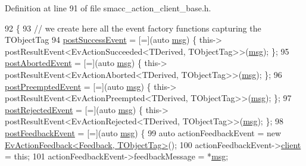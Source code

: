 Definition at line 91 of file smacc\+\_\+action\+\_\+client\+\_\+base.\+h.


\begin{DoxyCode}
92     \{
93         \textcolor{comment}{// we create here all the event factory functions capturing the TObjectTag}
94         \hyperlink{classsmacc_1_1client__bases_1_1SmaccActionClientBase_afb4f82508cd653d496392f321e84a783}{postSuccessEvent} = [=](\textcolor{keyword}{auto} \hyperlink{namespacebattery__monitor__node_ab1920c64448816edd4064e494275fdff}{msg}) \{ this->
      postResultEvent<EvActionSucceeded<TDerived, TObjectTag>>(\hyperlink{namespacebattery__monitor__node_ab1920c64448816edd4064e494275fdff}{msg}); \};
95         \hyperlink{classsmacc_1_1client__bases_1_1SmaccActionClientBase_a9ca2952ededeec233ee6d8a9a39c680b}{postAbortedEvent} = [=](\textcolor{keyword}{auto} \hyperlink{namespacebattery__monitor__node_ab1920c64448816edd4064e494275fdff}{msg}) \{ this->
      postResultEvent<EvActionAborted<TDerived, TObjectTag>>(\hyperlink{namespacebattery__monitor__node_ab1920c64448816edd4064e494275fdff}{msg}); \};
96         \hyperlink{classsmacc_1_1client__bases_1_1SmaccActionClientBase_a9513e302d447b04aafbca574d37a9ecc}{postPreemptedEvent} = [=](\textcolor{keyword}{auto} \hyperlink{namespacebattery__monitor__node_ab1920c64448816edd4064e494275fdff}{msg}) \{ this->
      postResultEvent<EvActionPreempted<TDerived, TObjectTag>>(\hyperlink{namespacebattery__monitor__node_ab1920c64448816edd4064e494275fdff}{msg}); \};
97         \hyperlink{classsmacc_1_1client__bases_1_1SmaccActionClientBase_a04cb60c48127e5534c1ce7045fb5abdc}{postRejectedEvent} = [=](\textcolor{keyword}{auto} \hyperlink{namespacebattery__monitor__node_ab1920c64448816edd4064e494275fdff}{msg}) \{ this->
      postResultEvent<EvActionRejected<TDerived, TObjectTag>>(\hyperlink{namespacebattery__monitor__node_ab1920c64448816edd4064e494275fdff}{msg}); \};
98         \hyperlink{classsmacc_1_1client__bases_1_1SmaccActionClientBase_ac754fb0adfc982fe1adde0d92842a33b}{postFeedbackEvent} = [=](\textcolor{keyword}{auto} \hyperlink{namespacebattery__monitor__node_ab1920c64448816edd4064e494275fdff}{msg}) \{
99             \textcolor{keyword}{auto} actionFeedbackEvent = \textcolor{keyword}{new} 
      \hyperlink{structsmacc_1_1default__events_1_1EvActionFeedback}{EvActionFeedback<Feedback, TObjectTag>}();
100             actionFeedbackEvent->\hyperlink{structsmacc_1_1default__events_1_1EvActionFeedback_a356e106d4c54e12dc81a0f3063ecff4a}{client} = \textcolor{keyword}{this};
101             actionFeedbackEvent->feedbackMessage = *\hyperlink{namespacebattery__monitor__node_ab1920c64448816edd4064e494275fdff}{msg};

\end{DoxyCode}
